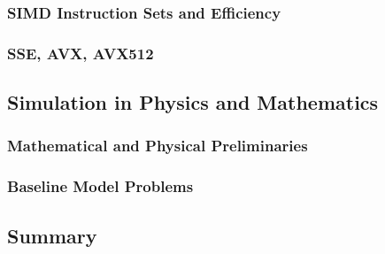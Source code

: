 \documentclass[crop=false]{standalone}
\begin{document}

      \subsubsection*{SIMD Instruction Sets and Efficiency} %
      \label{ssub:simd_instruction_sets_and_efficiency}


      \subsubsection*{SSE, AVX, AVX512} %
      \label{ssub:sse_avx_avx512}


    \subsection{Simulation in Physics and Mathematics} %
    \label{sub:simulation_in_physics_and_mathematics}
      \subsubsection*{Mathematical and Physical Preliminaries} %
      \label{ssub:mathematical_and_physical_preliminaries}


      \subsubsection*{Baseline Model Problems} %
      \label{ssub:baseline_model_problems}


    \subsection{Summary} %
    \label{sub:summary}

\end{document}
